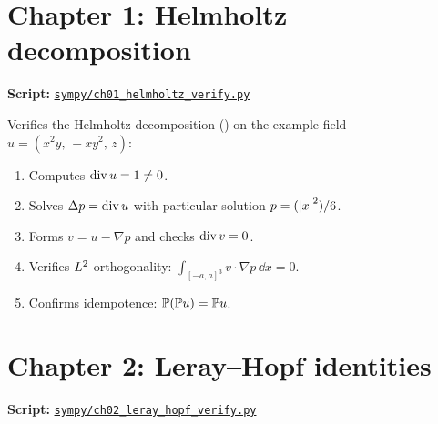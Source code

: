 \section{Chapter 1: Helmholtz decomposition}
\label{sec:sympy-ch01-helmholtz}

\textbf{Script:}
\href{https://github.com/alejandro-soto-franco/navier-stokes/blob/main/sympy/ch01_helmholtz_verify.py}%
{\texttt{sympy/ch01\_helmholtz\_verify.py}}

\medskip\noindent
Verifies the Helmholtz decomposition () on the example field
$u = (x^2 y,\, {-}xy^2,\, z)$:
\begin{enumerate}[label=(\roman*)]
  \item Computes $\operatorname{div} u = 1 \neq 0$.
  \item Solves $\Delta p = \operatorname{div} u$ with particular solution
    $p = (\left\lvert x \right\rvert^2)/6$.
  \item Forms $v = u - \nabla p$ and checks $\operatorname{div} v = 0$.
  \item Verifies $L^{2}$-orthogonality:
    $\int_{[-a,a]^3} v \cdot \nabla p\,\dd x = 0$.
  \item Confirms idempotence: $\mathbb{P}(\mathbb{P} u) = \mathbb{P} u$.
\end{enumerate}

\section{Chapter 2: Leray--Hopf identities}
\label{sec:sympy-ch02}

\textbf{Script:}
\href{https://github.com/alejandro-soto-franco/navier-stokes/blob/main/sympy/ch02_leray_hopf_verify.py}%
{\texttt{sympy/ch02\_leray\_hopf\_verify.py}}

